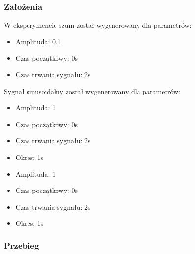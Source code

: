 \documentclass[12pt]{article}
\begin{document}
\subsubsection{Założenia}
W eksperymencie szum został wygenerowany dla parametrów:
\begin{itemize}
    \item Amplituda: 0.1
    \item Czas początkowy: 0s
    \item Czas trwania sygnału: 2s
\end{itemize}
Sygnał sinusoidalny został wygenerowany dla parametrów:
\begin{itemize}
	\item Amplituda: 1
	\item Czas początkowy: 0s
	\item Czas trwania sygnału: 2s
	\item Okres: 1s
\end{itemize}
\begin{itemize}
    \item Amplituda: 1
    \item Czas początkowy: 0s
    \item Czas trwania sygnału: 2s
    \item Okres: 1s
\end{itemize}
\subsubsection{Przebieg}
\end{document}
